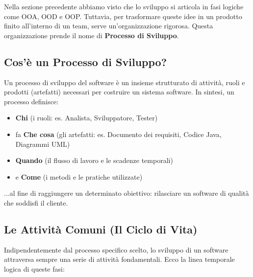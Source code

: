 \documentclass[10pt, a4paper]{article}
\begin{document}
Nella sezione precedente abbiamo visto che lo sviluppo si articola in fasi logiche come OOA, OOD e OOP. Tuttavia, per trasformare queste idee in un prodotto finito all'interno di un team, serve un'organizzazione rigorosa. Questa organizzazione prende il nome di \textbf{Processo di Sviluppo}.

\subsection{Cos'è un Processo di Sviluppo?}
Un processo di sviluppo del software è un insieme strutturato di attività, ruoli e prodotti (artefatti) necessari per costruire un sistema software. In sintesi, un processo definisce:
\begin{itemize}
    \item \textbf{Chi} (i ruoli: es. Analista, Sviluppatore, Tester)
    \item fa \textbf{Che cosa} (gli artefatti: es. Documento dei requisiti, Codice Java, Diagrammi UML)
    \item \textbf{Quando} (il flusso di lavoro e le scadenze temporali)
    \item e \textbf{Come} (i metodi e le pratiche utilizzate)
\end{itemize}
...al fine di raggiungere un determinato obiettivo: rilasciare un software di qualità che soddisfi il cliente.

\subsection{Le Attività Comuni (Il Ciclo di Vita)}
Indipendentemente dal processo specifico scelto, lo sviluppo di un software attraversa sempre una serie di attività fondamentali. Ecco la linea temporale logica di queste fasi:
\end{document}
